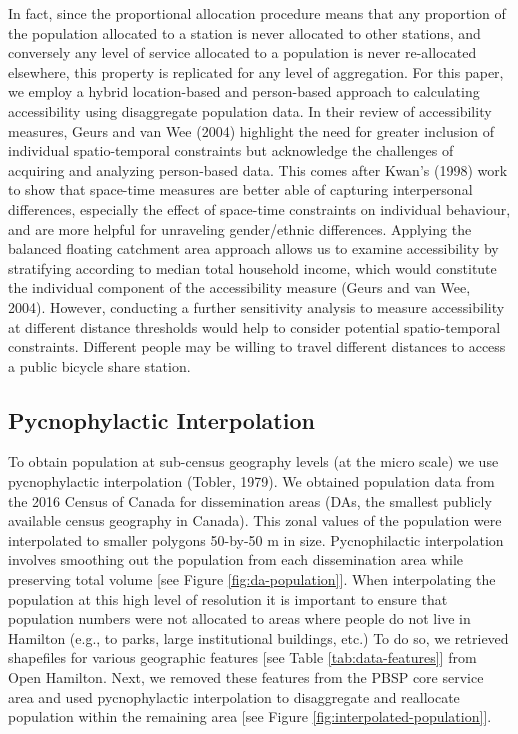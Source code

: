 \documentclass[]{elsarticle} %
\begin{document}
In fact, since the proportional allocation procedure means that any
proportion of the population allocated to a station is never allocated
to other stations, and conversely any level of service allocated to a
population is never re-allocated elsewhere, this property is replicated
for any level of aggregation. For this paper, we employ a hybrid
location-based and person-based approach to calculating accessibility
using disaggregate population data. In their review of accessibility
measures, Geurs and van Wee (2004) highlight the need for greater
inclusion of individual spatio-temporal constraints but acknowledge the
challenges of acquiring and analyzing person-based data. This comes
after Kwan's (1998) work to show that space-time measures are better
able of capturing interpersonal differences, especially the effect of
space-time constraints on individual behaviour, and are more helpful for
unraveling gender/ethnic differences. Applying the balanced floating
catchment area approach allows us to examine accessibility by
stratifying according to median total household income, which would
constitute the individual component of the accessibility measure (Geurs
and van Wee, 2004). However, conducting a further sensitivity analysis
to measure accessibility at different distance thresholds would help to
consider potential spatio-temporal constraints. Different people may be
willing to travel different distances to access a public bicycle share
station.

\hypertarget{pycnophylactic-interpolation}{%
\subsection{Pycnophylactic
Interpolation}\label{pycnophylactic-interpolation}}

To obtain population at sub-census geography levels (at the micro scale)
we use pycnophylactic interpolation (Tobler, 1979). We obtained
population data from the 2016 Census of Canada for dissemination areas
(DAs, the smallest publicly available census geography in Canada). This
zonal values of the population were interpolated to smaller polygons
50-by-50 m in size. Pycnophilactic interpolation involves smoothing out
the population from each dissemination area while preserving total
volume {[}see Figure \ref{fig:da-population}{]}. When interpolating the
population at this high level of resolution it is important to ensure
that population numbers were not allocated to areas where people do not
live in Hamilton (e.g., to parks, large institutional buildings, etc.)
To do so, we retrieved shapefiles for various geographic features {[}see
Table \ref{tab:data-features}{]} from Open Hamilton. Next, we removed
these features from the PBSP core service area and used pycnophylactic
interpolation to disaggregate and reallocate population within the
remaining area {[}see Figure \ref{fig:interpolated-population}{]}.
\end{document}
